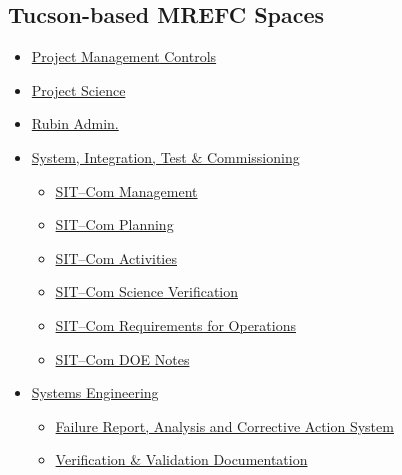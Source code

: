\begin{small}

\subsection{Tucson-based MREFC Spaces}

\begin{itemize}
	\item \href{https://confluence.lsstcorp.org/display/PC/Project+Management+Controls+System+Home}{Project Management Controls}
	\item \href{https://confluence.lsstcorp.org/display/PS/Project+Science+Home}{Project Science}
	\item \href{https://confluence.lsstcorp.org/display/ROA/Rubin+Obs.+Admins}{Rubin Admin.}
	\item \href{https://confluence.lsstcorp.org/pages/viewpage.action?pageId=48399826}{System, Integration, Test \& Commissioning}
	\begin{itemize}
		\item \href{https://confluence.lsstcorp.org/display/LSSTCOM/SIT-Com+Management?src=contextnavpagetreemode}{SIT--Com Management}
		\item \href{https://confluence.lsstcorp.org/display/LSSTCOM/SIT-Com+Planning?src=contextnavpagetreemode}{SIT--Com Planning}
		\item \href{https://confluence.lsstcorp.org/display/LSSTCOM/SIT-Com+Activities?src=contextnavpagetreemode}{SIT--Com Activities}
		\item \href{https://confluence.lsstcorp.org/display/LSSTCOM/SIT-Com+Science+Verification?src=contextnavpagetreemode}{SIT--Com Science Verification}
		\item\href{https://confluence.lsstcorp.org/display/LSSTCOM/SIT-Com+Requirements+for+Operations?src=contextnavpagetreemode}{SIT--Com Requirements for Operations}
		\item \href{https://confluence.lsstcorp.org/display/LSSTCOM/DOE+Notes?src=contextnavpagetreemode}{SIT--Com DOE Notes}
	\end{itemize}
	\item \href{https://confluence.lsstcorp.org/display/SYSENG/Systems+Engineering+Home}{Systems Engineering}
	\begin{itemize}
		\item \href{https://confluence.lsstcorp.org/pages/viewpage.action?pageId=97681640}{Failure Report, Analysis and Corrective Action System}
		\item \href{https://confluence.lsstcorp.org/pages/viewpage.action?pageId=100173626}{Verification \& Validation Documentation}

\end{itemize}
\end{itemize}
\end{small}
